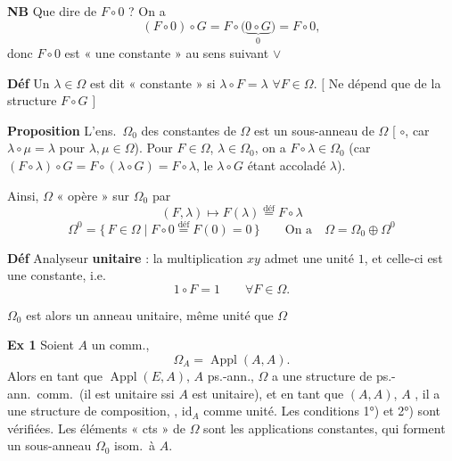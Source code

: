 \documentclass[11pt,a4paper]{article}
\begin{document}


\textbf{NB} \quad Que dire de $F \circ 0$ ? On a
\[
(F \circ 0) \circ G = F \circ \bigl(\underbrace{0 \circ G}_{0}\bigr) = F \circ 0 ,
\]
donc $F \circ 0$ est « une constante » au sens suivant $\vee$

\textbf{Déf} \quad Un $\lambda \in \Omega$ est dit « constante » si
$\lambda \circ F = \lambda$ $\forall F \in \Omega$.
$\bigl[$ Ne dépend que de la structure $F \circ G$ $\bigr]$

\textbf{Proposition} \quad L'ens.\ $\Omega_0$ des constantes de $\Omega$ est un
sous-anneau de $\Omega$ [ $\circ$, car
$\lambda \circ \mu = \lambda$ pour $\lambda, \mu \in \Omega$). Pour $F \in \Omega$, $\lambda \in \Omega_0$, on a
$F \circ \lambda \in \Omega_0$ (car
$(F \circ \lambda) \circ G = F \circ (\lambda \circ G) = F \circ \lambda$, le
$\lambda \circ G$ étant accoladé $\lambda$).

Ainsi, $\Omega$ « opère » sur $\Omega_0$ par
\[
(F,\lambda) \longmapsto F(\lambda) \overset{\text{déf}}{=} F \circ \lambda
\]
\[
\Omega^{0} = \{\, F \in \Omega \mid F \circ 0 \overset{\text{déf}}{=} F(0) = 0 \,\}
\qquad \text{On a} \quad \Omega = \Omega_0 \oplus \Omega^{0}
\]

\textbf{Déf} \quad Analyseur \textbf{unitaire} : la multiplication $xy$ admet
une unité $1$, et celle-ci est une constante, i.e.
\[
1 \circ F = 1 \qquad \forall F \in \Omega .
\]

 $\Omega_0$ est alors un anneau unitaire, 
 même unité que $\Omega$



\textbf{Ex 1} \quad Soient  $A$ un
  comm.,
\[
\Omega_A = \operatorname{Appl}(A,A) .
\]
Alors en tant que $\operatorname{Appl}(E,A)$, $A$ ps.-ann., $\Omega$ a une
structure de ps.-ann.\ comm.\ (il est unitaire ssi \struck{$\Omega$} $A$
est unitaire), et en tant que $(A,A)$, $A$
, il a une structure de composition, \struck{\ill{}}
,  $\mathrm{id}_A$ comme unité. Les
conditions 1°) et 2°) sont vérifiées. Les \struck{\ill{}} éléments « cts » de
$\Omega$ sont les applications constantes, qui forment un
sous-anneau $\Omega_0$ isom.\ à $A$.
\end{document}

